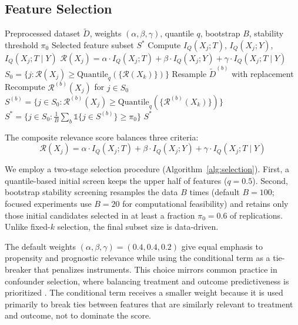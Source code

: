 \documentclass{svproc}
\newcommand{\QMI}{I_Q}
\begin{document}
\subsection{Feature Selection}
\label{subsec:selection}

\begin{algorithm}[htbp]
\caption{QMI-CFS Feature Selection}
\label{alg:selection}
\begin{algorithmic}[1]
\Require Preprocessed dataset $\tilde{D}$, weights $(\alpha, \beta, \gamma)$, quantile $q$, bootstrap $B$, stability threshold $\pi_0$
\Ensure Selected feature subset $S^*$
    \State Compute $\QMI(X_j; T)$, $\QMI(X_j; Y)$, $\QMI(X_j; T \mid Y)$
    \State $\mathcal{R}(X_j) = \alpha \cdot \QMI(X_j; T) + \beta \cdot \QMI(X_j; Y) + \gamma \cdot \QMI(X_j; T \mid Y)$
\EndFor
\State $S_0 = \{j : \mathcal{R}(X_j) \geq \text{Quantile}_q(\{\mathcal{R}(X_k)\})\}$
    \State Resample $\tilde{D}^{(b)}$ with replacement
    \State Recompute $\mathcal{R}^{(b)}(X_j)$ for $j \in S_0$
    \State $S^{(b)} = \{j \in S_0 : \mathcal{R}^{(b)}(X_j) \geq \text{Quantile}_q(\{\mathcal{R}^{(b)}(X_k)\})\}$
\EndFor
\State $S^* = \{j \in S_0 : \frac{1}{B}\sum_b \mathbb{1}\{j \in S^{(b)}\} \geq \pi_0\}$
\State \Return $S^*$
\end{algorithmic}
\end{algorithm}

The composite relevance score balances three criteria:
\begin{equation}
    \label{eq:relevance}
    \mathcal{R}(X_j) = \alpha \cdot \QMI(X_j; T) + \beta \cdot \QMI(X_j; Y) + \gamma \cdot \QMI(X_j; T \mid Y)
\end{equation}

We employ a two-stage selection procedure (Algorithm~\ref{alg:selection}). First, a quantile-based initial screen keeps the upper half of features ($q=0.5$). Second, bootstrap stability screening resamples the data $B$ times (default $B=100$; focused experiments use $B=20$ for computational feasibility) and retains only those initial candidates selected in at least a fraction $\pi_0=0.6$ of replications. Unlike fixed-$k$ selection, the final subset size is data-driven.

The default weights $(\alpha, \beta, \gamma) = (0.4, 0.4, 0.2)$ give equal emphasis to propensity and prognostic relevance while using the conditional term as a tie-breaker that penalizes instruments. This choice mirrors common practice in confounder selection, where balancing treatment and outcome predictiveness is prioritized \cite{vansteelandt2012model}. The conditional term receives a smaller weight because it is used primarily to break ties between features that are similarly relevant to treatment and outcome, not to dominate the score.
\end{document}
